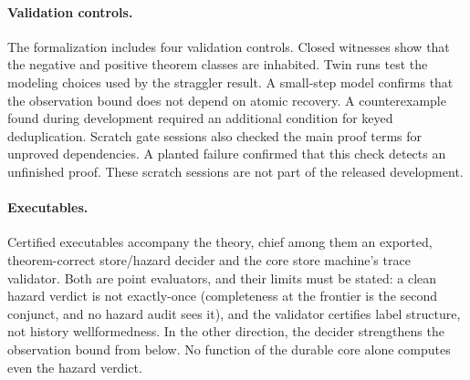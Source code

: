 \documentclass[sigplan,10pt]{acmart}
\theoremstyle{plain}
\theoremstyle{definition}
\begin{document}
\paragraph{Validation controls.}
The formalization includes four validation controls. Closed witnesses
show that the negative and positive theorem classes are inhabited.
Twin runs test the modeling choices used by the straggler result. A
small-step model confirms that the observation bound does not depend
on atomic recovery. A counterexample found during development required
an additional condition for keyed deduplication. Scratch gate sessions
also checked the main proof terms for unproved dependencies. A planted
failure confirmed that this check detects an unfinished proof. These
scratch sessions are not part of the released development.

\paragraph{Executables.}
Certified executables accompany the theory, chief among them an
exported, theorem-correct store/hazard decider and the core store
machine's trace validator. Both are point evaluators, and their limits
must be stated: a clean hazard verdict is not
exactly-once (completeness at the frontier is the second conjunct,
and no hazard audit sees it), and the validator certifies label
structure, not history wellformedness. In the other direction, the
decider strengthens the observation bound from below. No function of the
durable core alone computes even the hazard verdict.
\end{document}
